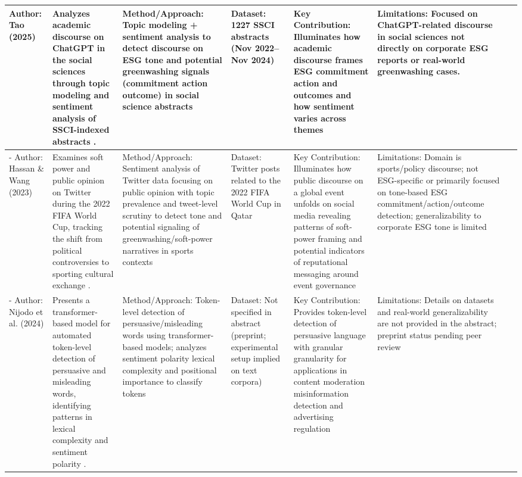 \documentclass{article}
\begin{document}
\begin{landscape}
\begin{longtable}{p{1.8cm}
p{2.6cm}
p{3.4cm}
p{2.6cm}
p{3.5cm}
p{3.5cm}
p{0.8cm}}
Author: Tao (2025) & Analyzes academic discourse on ChatGPT in the social sciences through topic modeling and sentiment analysis of SSCI-indexed abstracts  \parencite{yating_tao_4d841cc1}. & Method/Approach: Topic modeling + sentiment analysis to detect discourse on ESG tone and potential greenwashing signals (commitment action outcome) in social science abstracts & Dataset: 1227 SSCI abstracts (Nov 2022–Nov 2024) & Key Contribution: Illuminates how academic discourse frames ESG commitment action and outcomes and how sentiment varies across themes & Limitations: Focused on ChatGPT-related discourse in social sciences not directly on corporate ESG reports or real-world greenwashing cases. & ~ \\ \hline
- Author: Hassan \& Wang (2023) & Examines soft power and public opinion on Twitter during the 2022 FIFA World Cup, tracking the shift from political controversies to sporting cultural exchange  \parencite{ahmed_a__m__hassan_b359565d}. & Method/Approach: Sentiment analysis of Twitter data focusing on public opinion with topic prevalence and tweet-level scrutiny to detect tone and potential signaling of greenwashing/soft-power narratives in sports contexts & Dataset: Twitter posts related to the 2022 FIFA World Cup in Qatar & Key Contribution: Illuminates how public discourse on a global event unfolds on social media revealing patterns of soft-power framing and potential indicators of reputational messaging around event governance & Limitations: Domain is sports/policy discourse; not ESG-specific or primarily focused on tone-based ESG commitment/action/outcome detection; generalizability to corporate ESG tone is limited & ~ \\ \hline
- Author: Nijodo et al. (2024) & Presents a transformer-based model for automated token-level detection of persuasive and misleading words, identifying patterns in lexical complexity and sentiment polarity  \parencite{david_nijodo_d9217b51}. & Method/Approach: Token-level detection of persuasive/misleading words using transformer-based models; analyzes sentiment polarity lexical complexity and positional importance to classify tokens & Dataset: Not specified in abstract (preprint; experimental setup implied on text corpora) & Key Contribution: Provides token-level detection of persuasive language with granular granularity for applications in content moderation misinformation detection and advertising regulation & Limitations: Details on datasets and real-world generalizability are not provided in the abstract; preprint status pending peer review & ~ \\ \hline

\end{longtable}
\end{landscape}
\end{document}
